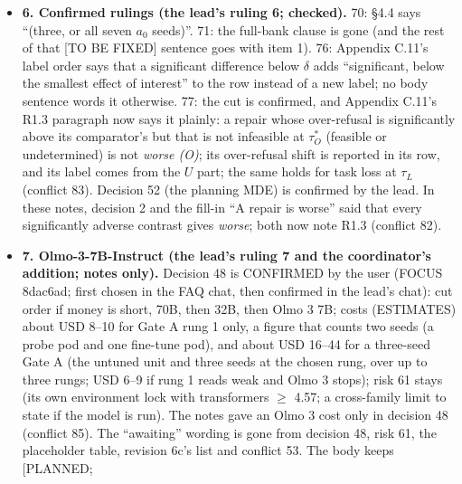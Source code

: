 \documentclass{article}
\theoremstyle{plain}
\theoremstyle{definition}
\theoremstyle{remark}
\begin{document}
\begin{itemize}
        side) inside $\pm$5~pp; the row names the grade (DRAFT \S{}4.3,
        \S{}4.5). $\Phi$'s paragraph said ``Equivalence is read per comparison,
        outside $\Phi$'' and now says ``Equivalence is read outside $\Phi$, in
        two grades (below)''. B3's ``the frozen rule'' is written ``the rule of
        \S{}3.2'' (conflict 80). C1: item 3.
  \item \textbf{6. Confirmed rulings (the lead's ruling 6; checked).} 70:
        \S{}4.4 says ``(three, or all seven $a_0$ seeds)''. 71: the full-bank
        clause is gone (and the rest of that [TO BE FIXED] sentence goes with
        item 1). 76: Appendix C.11's label order says that a significant
        difference below $\delta$ adds ``significant, below the smallest effect
        of interest'' to the row instead of a new label; no body sentence words
        it otherwise. 77: the cut is confirmed, and Appendix C.11's R1.3
        paragraph now says it plainly: a repair whose over-refusal is
        significantly above its comparator's but that is not infeasible at
        $\tau_O^*$ (feasible or undetermined) is not \emph{worse (O)}; its
        over-refusal shift is reported in its row, and its label comes from the
        $U$ part; the same holds for task loss at $\tau_L$ (conflict 83).
        Decision 52 (the planning MDE) is confirmed by the lead. In these notes,
        decision 2 and the fill-in ``A repair is worse'' said that every
        significantly adverse contrast gives \emph{worse}; both now note R1.3
        (conflict 82).
  \item \textbf{7. Olmo-3-7B-Instruct (the lead's ruling 7 and the coordinator's
        addition; notes only).} Decision 48 is CONFIRMED by the user (FOCUS
        8dac6ad; first chosen in the FAQ chat, then confirmed in the lead's
        chat): cut order if money is short, 70B, then 32B, then Olmo 3 7B; costs
        (ESTIMATES) about USD 8--10 for Gate A rung 1 only, a figure that counts
        two seeds (a probe pod and one fine-tune pod), and about USD 16--44 for
        a three-seed Gate A (the untuned unit and three seeds at the chosen
        rung, over up to three rungs; USD 6--9 if rung 1 reads weak and Olmo 3
        stops); risk 61 stays (its own environment lock with transformers $\ge$
        4.57; a cross-family limit to state if the model is run). The notes gave
        an Olmo 3 cost only in decision 48 (conflict 85). The ``awaiting''
        wording is gone from decision 48, risk 61, the placeholder table,
        revision 6c's list and conflict 53. The body keeps [PLANNED;

\end{itemize}
\end{document}
